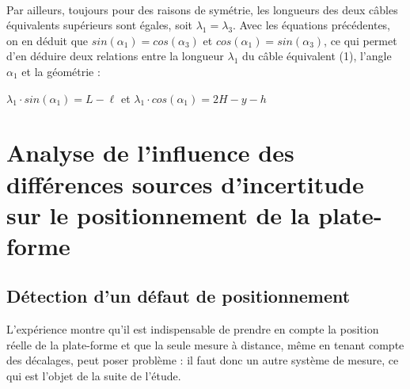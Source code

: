 
~\

Par ailleurs, toujours pour des raisons de symétrie, les longueurs des deux câbles équivalents supérieurs sont égales, soit $\lambda_1 = \lambda_3$. Avec les équations précédentes, on en déduit que $sin(\alpha_1)= cos(\alpha_3)$ et $cos(\alpha_1)=sin(\alpha_3)$, ce qui permet d’en déduire deux relations entre la longueur $\lambda_1$ du câble équivalent (1), l’angle $\alpha_1$ et la géométrie :

\begin{center}
$\lambda_1\cdot sin(\alpha_1)=L-\ell$ et $\lambda_1\cdot cos(\alpha_1)=2H-y-h$
\end{center}




\section{Analyse de l’influence des différences sources d’incertitude sur
le positionnement de la plate-forme}

\subsection{Détection d’un défaut de positionnement}

L'expérience montre qu’il est indispensable de prendre en compte la position réelle de la plate-forme et que la seule mesure à distance, même en tenant compte des décalages, peut poser problème : il faut donc un autre système de mesure, ce qui est l’objet de la suite de l’étude.


